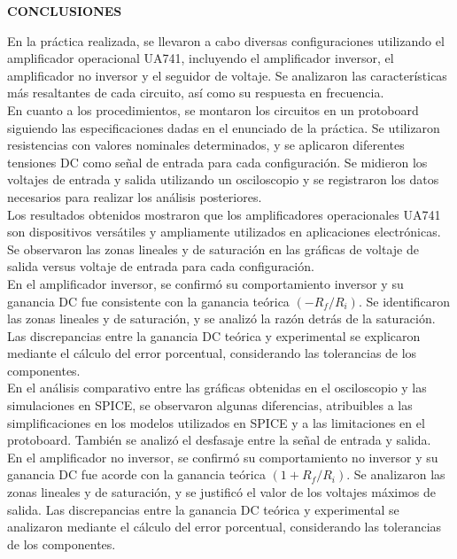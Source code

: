 \documentclass[12pt]{article}
\begin{document}
	\newpage
	
	\begin{center}
		\textbf{\large CONCLUSIONES}\\
	\end{center}
	
	En la práctica realizada, se llevaron a cabo diversas configuraciones utilizando el amplificador operacional UA741, incluyendo el amplificador inversor, el amplificador no inversor y el seguidor de voltaje. Se analizaron las características más resaltantes de cada circuito, así como su respuesta en frecuencia.\\
	
	En cuanto a los procedimientos, se montaron los circuitos en un protoboard siguiendo las especificaciones dadas en el enunciado de la práctica. Se utilizaron resistencias con valores nominales determinados, y se aplicaron diferentes tensiones DC como señal de entrada para cada configuración. Se midieron los voltajes de entrada y salida utilizando un osciloscopio y se registraron los datos necesarios para realizar los análisis posteriores.\\
	
	Los resultados obtenidos mostraron que los amplificadores operacionales UA741 son dispositivos versátiles y ampliamente utilizados en aplicaciones electrónicas. Se observaron las zonas lineales y de saturación en las gráficas de voltaje de salida versus voltaje de entrada para cada configuración.\\
	
	En el amplificador inversor, se confirmó su comportamiento inversor y su ganancia DC fue consistente con la ganancia teórica $(-R_{f}/R_{i})$. Se identificaron las zonas lineales y de saturación, y se analizó la razón detrás de la saturación. Las discrepancias entre la ganancia DC teórica y experimental se explicaron mediante el cálculo del error porcentual, considerando las tolerancias de los componentes.\\
	
	En el análisis comparativo entre las gráficas obtenidas en el osciloscopio y las simulaciones en SPICE, se observaron algunas diferencias, atribuibles a las simplificaciones en los modelos utilizados en SPICE y a las limitaciones en el protoboard. También se analizó el desfasaje entre la señal de entrada y salida.\\
	
	En el amplificador no inversor, se confirmó su comportamiento no inversor y su ganancia DC fue acorde con la ganancia teórica $(1 + R_{f}/R_{i})$. Se analizaron las zonas lineales y de saturación, y se justificó el valor de los voltajes máximos de salida. Las discrepancias entre la ganancia DC teórica y experimental se analizaron mediante el cálculo del error porcentual, considerando las tolerancias de los componentes.\\
	
\end{document}
